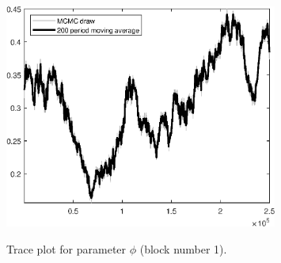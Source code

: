 \begin{figure}[H]
\centering
  \includegraphics[width=0.8\textwidth]{BRS_growth_ext_comovement/graphs/TracePlot_phi_blck_1}\\
    \caption{Trace plot for parameter ${\phi}$ (block number 1).}
\end{figure}
